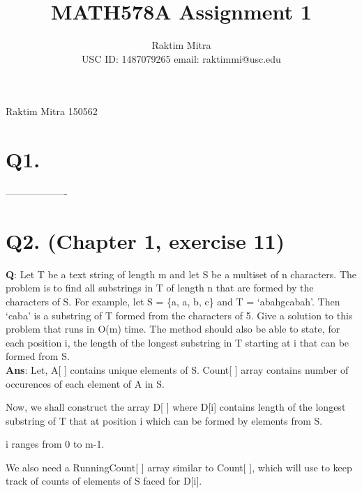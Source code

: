 \documentclass[a4paper,11pt]{article}
\begin{document}
\title{MATH578A Assignment 1 }
\author{Raktim Mitra \\ \small{USC ID: 1487079265\hspace{10pt} email: raktimmi@usc.edu}}
\maketitle
{}                              					%
								{Raktim Mitra}      						           		%
								{150562}																		%
								
\section*{Q1. }

\begin{center}
 -------------------
\end{center}

\section*{Q2. (Chapter 1, exercise 11)}
\textbf{Q}: Let T be a text string of length m and let S be a multiset of n characters. The problem is
to find all substrings in T of length n that are formed by the characters of S. For example,
let S = \{a, a, b, c\} and T = `abahgcabah'. Then `caba' is a substring of T formed from the
characters of 5.
Give a solution to this problem that runs in O(m) time. The method should also be able to
state, for each position i, the length of the longest substring in T starting at i that can be
formed from S.
\\
\textbf{Ans}: Let, A[ ] contains unique elements of S. Count[ ] array contains number of occurences of each element of A in S.


Now, we shall construct the array D[ ] where D[i] contains length of the longest substring of T that  at position i which can be formed by elements from S.

i ranges from 0 to m-1. 

We also need a RunningCount[ ] array similar to Count[ ], which will use to keep track of counts of elements of S faced for D[i].
\end{document}
